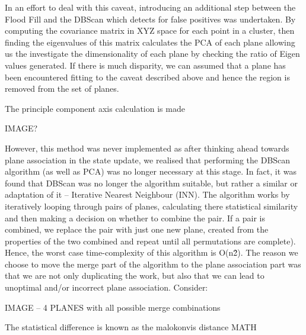 \documentclass[]{article}
\begin{document}
{In an effort to deal with this caveat, introducing an additional step between the Flood Fill and the DBScan which detects for false positives was undertaken. By computing the covariance matrix in XYZ space for each point in a cluster, then finding the eigenvalues of this matrix calculates the \ac{PCA} of each plane allowing us the investigate the dimensionality of each plane by checking the ratio of Eigen values generated. If there is much disparity, we can assumed that a plane has been encountered fitting to the caveat described above and hence the region is removed from the set of planes. 

The principle component axis calculation is made 

IMAGE?

However, this method was never implemented as after thinking ahead towards plane association in the state update, we realised that performing the DBScan algorithm (as well as \ac{PCA}) was no longer necessary at this stage. 
In fact, it was found that DBScan was no longer the algorithm suitable, but rather a similar or adaptation of it – Iterative Nearest Neighbour (INN). The algorithm works by iteratively looping through pairs of planes, calculating there statistical similarity and then making a decision on whether to combine the pair. 
If a pair is combined, we replace the pair with just one new plane, created from the properties of the two combined and repeat until all permutations are complete). Hence, the worst case time-complexity of this algorithm is O(n\^{2}).
The reason we choose to move the merge part of the algorithm to the plane association part was that we are not only duplicating the work, but also that we can lead to unoptimal and/or incorrect plane association. Consider:

IMAGE – 4 PLANES with all possible merge combinations 

The statistical difference is known as the malokonvis distance
MATH





}
\end{document}

